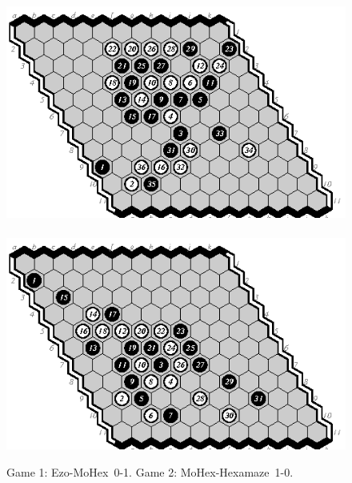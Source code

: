 \documentclass{icga}
\def\Eo{\mbox{\sc Ezo}}
\def\Hz{\mbox{\sc Hexamaze}}
\def\Mx{\mbox{\sc MoHex}}
\begin{document}
\begin{figure}[hbp]
\includegraphics[scale=1.3]{games/hexdiag/01-em-0-1.eps}\hspace*{-1cm}\
\includegraphics[scale=1.3]{games/hexdiag/02-mh-1-0.eps}
\caption{Game 1: \Eo-\Mx\ 0-1. Game 2: \Mx-\Hz\ 1-0.}
\end{figure}
\end{document}
